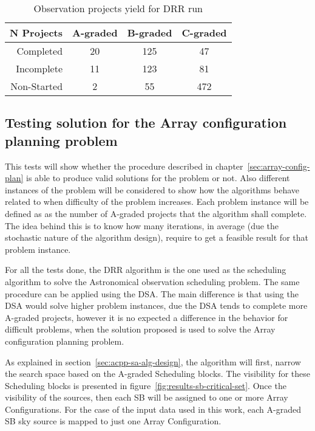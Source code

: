 \begin{table}[b!]
\centering
\begin{tabular}{|r|c|c|c|} \hline
 N Projects & A-graded & B-graded & C-graded \\ \hline
 Completed & 20 & 125 & 47 \\ \hline
 Incomplete & 11 & 123 & 81 \\ \hline
 Non-Started & 2 & 55 & 472 \\ \hline
\end{tabular}
\caption{Observation projects yield for DRR run}
\label{table:drr-run-summary}
\end{table}

\subsection{Testing solution for the Array configuration planning problem}
This tests will show whether the procedure described in chapter~\ref{sec:array-config-plan} is able to produce valid solutions for the problem or not. Also different instances of the problem will be considered to show how the algorithms behave related to when difficulty of the problem increases. Each problem instance will be defined as as the number of A-graded projects that the algorithm shall complete. The idea behind this is to know how many iterations, in average (due the stochastic nature of the algorithm design), require to get a feasible result for that problem instance.

For all the tests done, the DRR algorithm is the one used as the scheduling algorithm to solve the Astronomical observation scheduling problem. The same procedure can be applied using the DSA. The main difference is that using the DSA would solve higher problem instances, due the DSA tends to complete more A-graded projects, however it is no expected a difference in the behavior for difficult problems, when the solution proposed is used to solve the Array configuration planning problem.   

As explained in section~\ref{sec:acpp-sa-alg-design}, the algorithm will first, narrow the search space based on the A-graded Scheduling blocks.  The visibility for these Scheduling blocks is presented in figure~\ref{fig:results-sb-critical-set}. Once the visibility of the sources, then each SB will be assigned to one or more Array Configurations. For the case of the input data used in this work, each A-graded SB sky source is mapped to just one Array Configuration.


